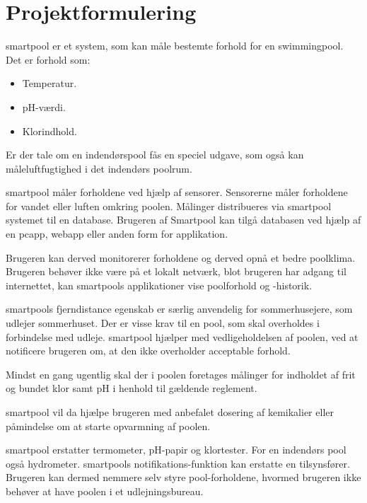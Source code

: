 \section{Projektformulering}

\gls{smartpool} er et system, som kan måle bestemte forhold for en swimmingpool. 
Det er forhold som:

\begin{itemize}
	\item Temperatur.
	\item pH-værdi.
	\item Klorindhold.
\end{itemize}

Er der tale om en indendørspool fås en speciel udgave, som også kan måleluftfugtighed i det indendørs poolrum.

\gls{smartpool} måler forholdene ved hjælp af sensorer. Sensorerne måler forholdene for vandet eller luften omkring poolen. Målinger distribueres via \gls{smartpool} systemet til en database. Brugeren af Smartpool kan tilgå databasen ved hjælp af en \gls{pcapp}, \gls{webapp} eller anden form for applikation. 

Brugeren kan derved monitorerer forholdene og derved opnå et bedre poolklima. Brugeren behøver ikke være på et lokalt netværk, blot brugeren har adgang til internettet, kan \glspl{smartpool} applikationer vise poolforhold og -historik. 

\glspl{smartpool} fjerndistance egenskab er særlig anvendelig for sommerhusejere, som udlejer sommerhuset. Der er visse krav til en pool, som skal overholdes i forbindelse med udleje. \gls{smartpool} hjælper med vedligeholdelsen af poolen, ved at notificere brugeren om, at den ikke overholder acceptable forhold. 

Mindst en gang ugentlig skal der i poolen foretages målinger for indholdet af frit og bundet klor samt pH i henhold til gældende reglement.

\gls{smartpool} vil da hjælpe brugeren med anbefalet dosering af kemikalier eller påmindelse om at starte opvarmning af poolen.

\gls{smartpool} erstatter termometer, pH-papir og klortester. For en indendørs pool også hydrometer. \glspl{smartpool} notifikations-funktion kan erstatte en tilsynsfører. Brugeren kan dermed nemmere selv styre pool-forholdene, hvormed brugeren ikke behøver at have poolen i et udlejningsbureau.
